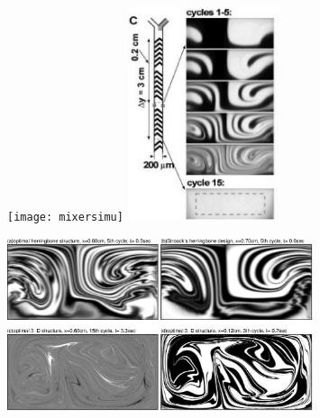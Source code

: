 \documentclass[12pt,t]{beamer}
\begin{document}
\begin{frame}
  \begin{figure}
    \centerline{
       \texttt{[image: mixersimu]}
       \includegraphics[width=0.4\textwidth]{stroockcrosssection0}
    }
  \end{figure}
\end{frame}

\begin{frame}
  \begin{figure}
    \centerline{
     \includegraphics[width=0.8\textwidth]{example2crosscompare}
    }
  \end{figure}
\end{frame}
\end{document}
